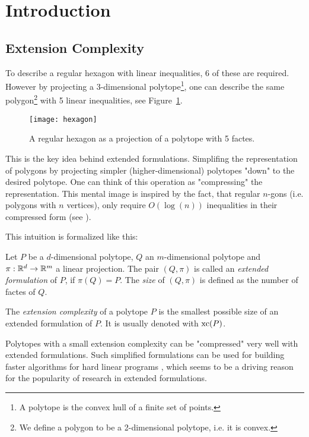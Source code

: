 \section{Introduction} 

\subsection{Extension Complexity}

To describe a regular hexagon with linear inequalities, 6 of these are required. However by projecting a 3-dimensional polytope\footnote{A polytope is the convex hull of a finite set of points.}, one can describe the same polygon\footnote{We define a polygon to be a 2-dimensional polytope, i.e. it is convex.} with 5 linear inequalities, see Figure~\ref{fig:hexagon}. 

\begin{figure}[h]
  \centering
  \texttt{[image: hexagon]}
  \caption{A regular hexagon as a projection of a polytope with 5 factes. \cite[Figure 1]{kwan2020extension}}
  \label{fig:hexagon}
\end{figure}

This is the key idea behind extended formulations. Simplifing the representation of polygons by projecting simpler (higher-dimensional) polytopes "down" to the desired polytope.
One can think of this operation as "compressing" the representation. This mental image is inspired by the fact, that regular $n$-gons (i.e. polygons with $n$ vertices), only require $O(\log(n))$ inequalities in their compressed form (see \cite{kaibel2010constructing}).

This intuition is formalized like this:

\begin{definition}
  Let $P$ be a $d$-dimensional polytope, $Q$ an $m$-dimensional polytope and $\pi:\mathbb{R}^d \to \mathbb{R}^m$ a linear projection.
  The pair $(Q,\pi)$ is called an \emph{extended formulation} of $P$, if $\pi(Q)=P$. The \emph{size} of $(Q,\pi)$ is defined as the number of factes of $Q$.
\end{definition}

\begin{definition}
  The \emph{extension complexity} of a polytope $P$ is the smallest possible size of an extended formulation of $P$. It is usually denoted with $\operatorname{xc}(P)$.
\end{definition}

Polytopes with a small extension complexity can be "compressed" very well with extended formulations.
Such simplified formulations can be used for building faster algorithms for hard linear programs \cite{yannakakis1991expressing}, which seems to be a driving reason for the popularity of research in extended formulations.


